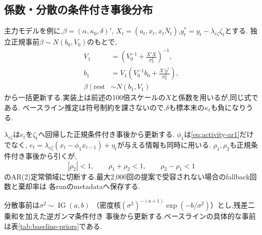\documentclass[11pt]{article}
\newcommand{\kt}{\kappa_t}
\begin{document}
\subsection{係数・分散の条件付き事後分布}
主力モデルを例に,$\beta=(\alpha,\kappa_0,\delta)'$,
$X_t=(a_t,x_t,x_t\bar N_t)$,$y_t^*=y_t-\lambda_{e\zeta}\zeta_t$とする.
独立正規事前$\beta\sim N(b_0,V_0)$のもとで,
\begin{align}
V_1&=\left(V_0^{-1}+\frac{X'X}{\sigma_\eta^2}\right)^{-1},\\
b_1&=V_1\left(V_0^{-1}b_0+\frac{X'y^*}{\sigma_\eta^2}\right),\\
\beta\mid\text{rest}&\sim N(b_1,V_1) \label{eq:beta-posterior}
\end{align}
から一括更新する.実装上は前述の100倍スケールの$X$と係数を用いるが,同じ式である.
ベースライン推定は符号制約を課さないので,$\delta$も標本末の$\kt$も負になりうる.

$\lambda_{e\zeta}$は$e_t$を$\zeta_t$へ回帰した正規条件付き事後から更新する.
$\phi_1$は\eqref{eq:activity-ar1}だけでなく,
$e_t=\lambda_{e\zeta}(x_t-\phi_1x_{t-1})+\eta_t$が与える情報も同時に用いる.
$\rho_1,\rho_2$も正規条件付き事後から引くが,
\begin{equation}
|\rho_2|<1,\qquad \rho_1+\rho_2<1,\qquad \rho_2-\rho_1<1
\end{equation}
のAR(2)定常領域に切断する.最大2,000回の提案で受容されない場合のfallback回数と棄却率は
各runのmetadataへ保存する.

分散事前は$\sigma^2\sim\operatorname{IG}(a,b)$
（密度核$(\sigma^2)^{-(a+1)}\exp(-b/\sigma^2)$）とし,残差二乗和を加えた逆ガンマ条件付き
事後から更新する.ベースラインの具体的な事前は表\ref{tab:baseline-priors}である.
\end{document}
